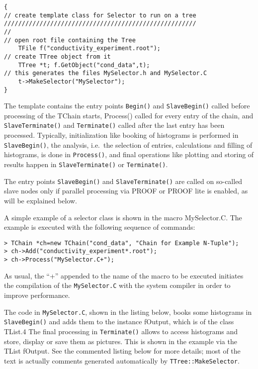 \documentclass{article}
\begin{document}
\begin{verbatim}
{
// create template class for Selector to run on a tree
//////////////////////////////////////////////////////
//
// open root file containing the Tree
    TFile f("conductivity_experiment.root");
// create TTree object from it
    TTree *t; f.GetObject("cond_data",t);
// this generates the files MySelector.h and MySelector.C
    t->MakeSelector("MySelector");
}
\end{verbatim}

The template contains the entry points \texttt{Begin()} and
\texttt{SlaveBegin()} called before processing of the TChain starts,
Process() called for every entry of the chain, and
\texttt{SlaveTerminate()} and \texttt{Terminate()} called after the last
entry has been processed. Typically, initialization like booking of
histograms is performed in \texttt{SlaveBegin()}, the analysis, i.e.~the
selection of entries, calculations and filling of histograms, is done in
\texttt{Process()}, and final operations like plotting and storing of
results happen in \texttt{SlaveTerminate()} or \texttt{Terminate()}.

The entry points \texttt{SlaveBegin()} and \texttt{SlaveTerminate()} are
called on so-called slave nodes only if parallel processing via PROOF or
PROOF lite is enabled, as will be explained below.

A simple example of a selector class is shown in the macro MySelector.C.
The example is executed with the following sequence of commands:

\begin{verbatim}
> TChain *ch=new TChain("cond_data", "Chain for Example N-Tuple");
> ch->Add("conductivity_experiment*.root");
> ch->Process("MySelector.C+");
\end{verbatim}

As usual, the ``+'' appended to the name of the macro to be executed
initiates the compilation of the \texttt{MySelector.C} with the system
compiler in order to improve performance.

The code in \texttt{MySelector.C}, shown in the listing below, books
some histograms in \texttt{SlaveBegin()} and adds them to the instance
fOutput, which is of the class TList.4 The final processing in
\texttt{Terminate()} allows to access histograms and store, display or
save them as pictures. This is shown in the example via the TList
fOutput. See the commented listing below for more details; most of the
text is actually comments generated automatically by
\texttt{TTree::MakeSelector}.
\end{document}
